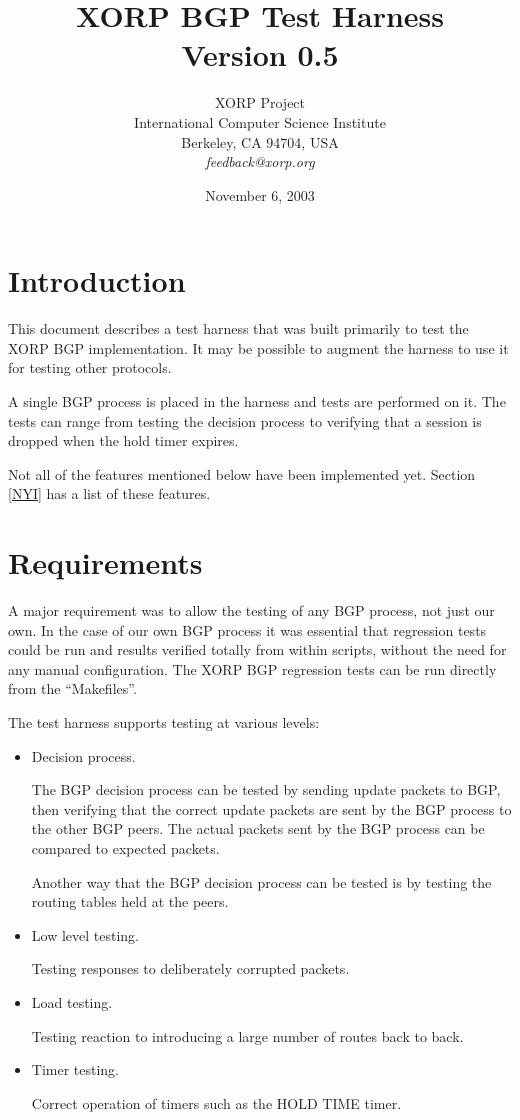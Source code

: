 \documentclass[11pt]{article}
\title{XORP BGP Test Harness \\
\vspace{1ex}
Version 0.5}
\author{ XORP Project                                   \\
         International Computer Science Institute       \\
         Berkeley, CA 94704, USA                        \\
         {\it feedback@xorp.org}
}
\date{November 6, 2003}
\begin{document}
\maketitle

\section{Introduction}

This document describes a test harness that was built primarily to
test the XORP BGP implementation. It may be possible to augment the
harness to use it for testing other protocols.

A single BGP process is placed in the harness and tests
are performed on it. The tests can range from testing the decision
process to verifying that a session is dropped when the hold timer expires.

Not all of the features mentioned below have been implemented yet.
Section \ref{NYI} has a list of these features.

\section{Requirements}

A major requirement was to allow the testing of any BGP process, not
just our own. In the case of our own BGP process it was essential that
regression tests could be run and results verified totally from within
scripts, without the need for any manual configuration. The
XORP BGP regression tests can be run directly from the ``Makefiles''.
\newline

The test harness supports testing at various levels:

\begin{itemize}
\item Decision process.

  The BGP decision process can be tested by sending update packets to
  BGP, then verifying that the correct update packets are sent by the
  BGP process to the other BGP peers. The actual packets sent by the
  BGP process can be compared to expected packets. 

  Another way that the BGP decision process can be tested is by
  testing the routing tables held at the peers.

\item Low level testing.

 Testing responses to deliberately corrupted packets.

\item Load testing. 

  Testing reaction to introducing a large number of routes back
  to back.

\item Timer testing.

  Correct operation of timers such as the HOLD TIME timer.

\end{itemize}
\end{document}
